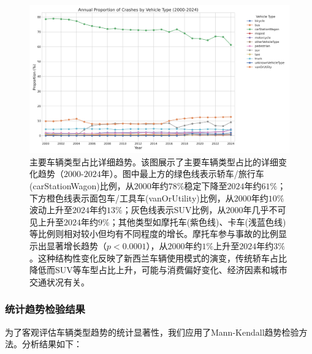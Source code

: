 \documentclass[12pt,a4paper]{article}
\begin{document}
\begin{figure}[H]
\centering
\includegraphics[height=0.3\textheight]{vehicle_type_proportion_trends.png}
\caption{主要车辆类型占比详细趋势。该图展示了主要车辆类型占比的详细变化趋势（$2000$-$2024$年）。图中最上方的绿色线表示轿车/旅行车(carStationWagon)比例，从$2000$年约$78\%$稳定下降至$2024$年约$61\%$；下方橙色线表示面包车/工具车(vanOrUtility)比例，从$2000$年约$10\%$波动上升至$2024$年约$13\%$；灰色线表示SUV比例，从$2000$年几乎不可见上升至$2024$年约$9\%$；其他类型如摩托车(紫色线)、卡车(浅蓝色线)等比例则相对较小但均有不同程度的增长。摩托车参与事故的比例显示出显著增长趋势（$p < 0.0001$），从$2000$年约$1\%$上升至$2024$年约$3\%$。这种结构性变化反映了新西兰车辆使用模式的演变，传统轿车占比降低而SUV等车型占比上升，可能与消费偏好变化、经济因素和城市交通状况有关。}
\label{fig:vehicle_type_proportion_trends}
\end{figure}

\subsubsection{统计趋势检验结果}

为了客观评估车辆类型趋势的统计显著性，我们应用了Mann-Kendall趋势检验方法。分析结果如下：
\end{document}
